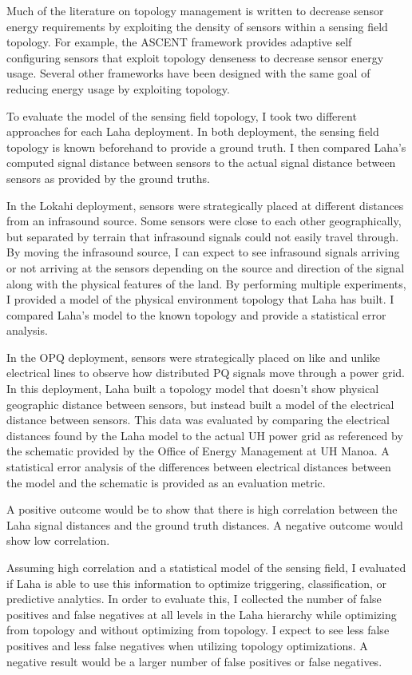 Much of the literature on topology management is written to decrease sensor energy requirements by exploiting the density of sensors within a sensing field topology. For example, the ASCENT\cite{cerpa2004ascent} framework provides adaptive self configuring sensors that exploit topology denseness to decrease sensor energy usage. Several other frameworks have been designed with the same goal of reducing energy usage by exploiting topology\cite{schurgers2002stem,schurgers2002topology}.

To evaluate the model of the sensing field topology, I took two different approaches for each Laha deployment. In both deployment, the sensing field topology is known beforehand to provide a ground truth. I then compared Laha's computed signal distance between sensors to the actual signal distance between sensors as provided by the ground truths.

In the Lokahi deployment, sensors were strategically placed at different distances from an infrasound source. Some sensors were close to each other geographically, but separated by terrain that infrasound signals could not easily travel through. By moving the infrasound source, I can expect to see infrasound signals arriving or not arriving at the sensors depending on the source and direction of the signal along with the physical features of the land. By performing multiple experiments, I provided a model of the physical environment topology that Laha has built. I compared Laha's model to the known topology and provide a statistical error analysis.

In the OPQ deployment, sensors were strategically placed on like and unlike electrical lines to observe how distributed PQ signals move through a power grid. In this deployment, Laha built a topology model that doesn't show physical geographic distance between sensors, but instead built a model of the electrical distance between sensors. This data was evaluated by comparing the electrical distances found by the Laha model to the actual UH power grid as referenced by the schematic provided by the Office of Energy Management at UH Manoa. A statistical error analysis of the differences between electrical distances between the model and the schematic is provided as an evaluation metric.

A positive outcome would be to show that there is high correlation between the Laha signal distances and the ground truth distances. A negative outcome would show low correlation.

Assuming high correlation and a statistical model of the sensing field, I evaluated if Laha is able to use this information to optimize triggering, classification, or predictive analytics. In order to evaluate this, I collected the number of false positives and false negatives at all levels in the Laha hierarchy while optimizing from topology and without optimizing from topology. I expect to see less false positives and less false negatives when utilizing topology optimizations. A negative result would be a larger number of false positives or false negatives.

